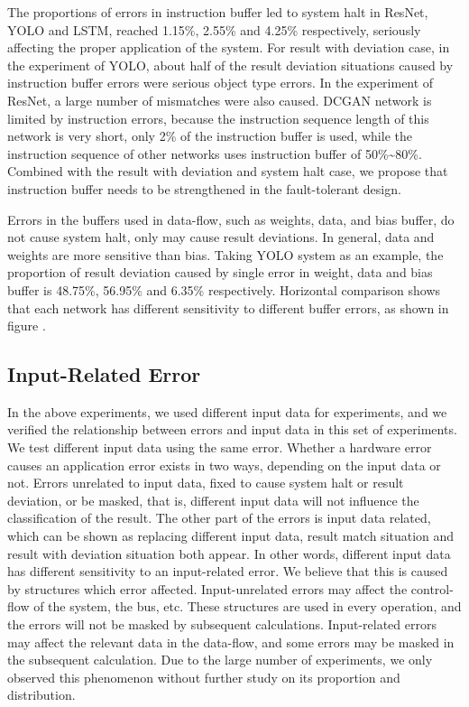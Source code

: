 The proportions of errors in instruction buffer led to system halt in ResNet, YOLO and LSTM, reached 1.15\%, 2.55\% and 4.25\% respectively, seriously affecting the proper application of the system. For result with deviation case, in the experiment of YOLO, about half of the result deviation situations caused by instruction buffer errors were serious object type errors. In the experiment of ResNet, a large number of mismatches were also caused. DCGAN network is limited by instruction errors, because the instruction sequence length of this network is very short, only 2\% of the instruction buffer is used, while the instruction sequence of other networks uses instruction buffer of 50\%\~{}80\%. Combined with the result with deviation and system halt case, we propose that instruction buffer needs to be strengthened in the fault-tolerant design.


Errors in the buffers used in data-flow, such as weights, data, and bias buffer, do not cause system halt, only may cause result deviations. In general, data and weights are more sensitive than bias. Taking YOLO system as an example, the proportion of result deviation caused by single error in weight, data and bias buffer is 48.75\%, 56.95\% and 6.35\% respectively. Horizontal comparison shows that each network has different sensitivity to different buffer errors, as shown in figure {}.


\subsection{Input-Related Error}
In the above experiments, we used different input data for 
experiments, and we verified the relationship between 
errors and input data in this set of experiments. We test 
different input data using the same error. Whether a 
hardware error causes an application error exists in two 
ways, depending on the input data or not. Errors unrelated 
to input data, fixed to cause system halt or result 
deviation, or be masked, that is, different input data will 
not influence the classification of the result. The other 
part of the errors is input data related, which can be 
shown as replacing different input data, result match 
situation and result with deviation situation both appear. 
In other words, different input data has different 
sensitivity to an input-related error. We believe that this 
is caused by structures which error affected. 
Input-unrelated errors may affect the control-flow of the 
system, the bus, etc. These structures are used in every 
operation, and the errors will not be masked by subsequent 
calculations. Input-related errors may affect the relevant 
data in the data-flow, and some errors may be masked in 
the subsequent calculation. Due to the large number of 
experiments, we only observed this phenomenon without 
further study on its proportion and distribution.


